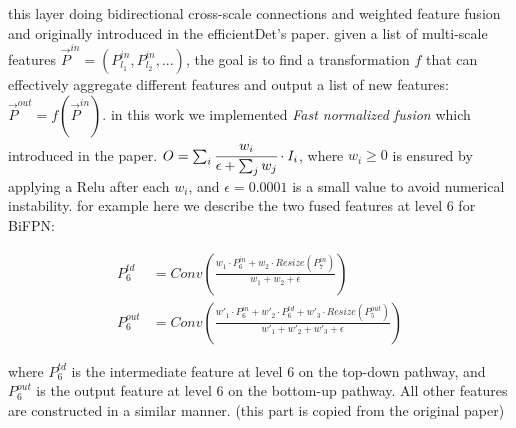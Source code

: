 \documentclass[11pt]{article}
\begin{document}
this layer doing bidirectional cross-scale connections
and weighted feature fusion and originally introduced in the efficientDet's paper. given a list of multi-scale features $\vec{P}^{in} = (P^{in}_{l_1}, P^{in}_{l_2}, ...)$, the goal is to find a transformation $f$ that can effectively aggregate different features and output a list of new features: $\vec{P}^{out} = f(\vec{P}^{in})$. in this work we implemented \textit{Fast normalized fusion} which introduced in the paper. $O = \sum_{i} \cfrac{w_i}{\epsilon + \sum_{j} w_j} \cdot I_i$, where $w_i \ge 0$ is ensured by applying a Relu after each $w_i$, and $\epsilon = 0.0001$ is a  small value to avoid numerical instability. for example here we describe the two fused features at level 6 for BiFPN:

\begin{align*} 
	P^{td}_6 &= Conv\left(\frac{w_1\cdot P^{in}_6  +     w_2 \cdot Resize(P^{in}_7)}{w_1 + w_2 + \epsilon}\right) \\
	P^{out}_6 &= Conv\left(\frac{w'_1\cdot P^{in}_6  +  w'_2 \cdot P^{td}_6 + w'_3 \cdot Resize(P^{out}_5)}{w'_1 + w'_2 + w'_3 + \epsilon}\right)
\end{align*}

where $P^{td}_6$ is the intermediate feature at level 6 on the top-down pathway, and $P^{out}_6$ is the output feature at level 6 on the bottom-up pathway. All other features are constructed in a similar manner. (this part is copied from the original paper)
\end{document}
